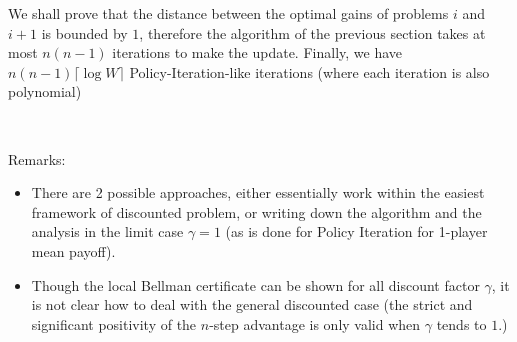 \documentclass{article}
\begin{document}
We shall prove that the distance between the optimal gains of problems $i$ and $i+1$ is bounded by $1$, therefore the algorithm of the previous section takes at most $n(n-1)$ iterations to make the update.
Finally, we have $n(n-1) \lceil \log W \rceil$ Policy-Iteration-like iterations (where each iteration is also polynomial)

~

Remarks:
\begin{itemize}
\item There are 2 possible approaches, either essentially work within the easiest framework of discounted problem, or writing down the algorithm and the analysis in the limit case $\gamma=1$ (as is done for Policy Iteration for 1-player mean payoff).
\item Though the local Bellman certificate can be shown for all discount factor $\gamma$, it is not clear how to deal with the general discounted case (the strict and significant positivity of the $n$-step advantage is only valid when $\gamma$ tends to $1$.)
\end{itemize}
    
\end{document}

